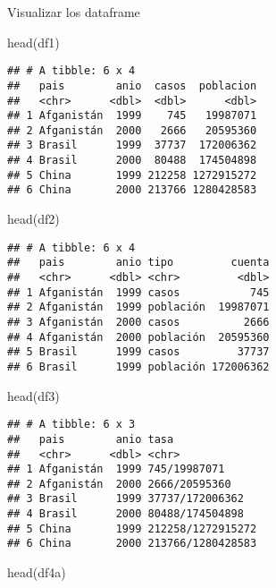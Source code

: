 \documentclass[
]{article}
\newenvironment{Shaded}{\begin{snugshade}}{\end{snugshade}}
\newcommand{\FunctionTok}[1]{\textcolor[rgb]{0.00,0.00,0.00}{#1}}
\newcommand{\NormalTok}[1]{#1}
\begin{document}
Visualizar los dataframe

\begin{Shaded}
\begin{Highlighting}[]
\FunctionTok{head}\NormalTok{(df1)}
\end{Highlighting}
\end{Shaded}

\begin{verbatim}
## # A tibble: 6 x 4
##   pais        anio  casos  poblacion
##   <chr>      <dbl>  <dbl>      <dbl>
## 1 Afganistán  1999    745   19987071
## 2 Afganistán  2000   2666   20595360
## 3 Brasil      1999  37737  172006362
## 4 Brasil      2000  80488  174504898
## 5 China       1999 212258 1272915272
## 6 China       2000 213766 1280428583
\end{verbatim}

\begin{Shaded}
\begin{Highlighting}[]
\FunctionTok{head}\NormalTok{(df2)}
\end{Highlighting}
\end{Shaded}

\begin{verbatim}
## # A tibble: 6 x 4
##   pais        anio tipo         cuenta
##   <chr>      <dbl> <chr>         <dbl>
## 1 Afganistán  1999 casos           745
## 2 Afganistán  1999 población  19987071
## 3 Afganistán  2000 casos          2666
## 4 Afganistán  2000 población  20595360
## 5 Brasil      1999 casos         37737
## 6 Brasil      1999 población 172006362
\end{verbatim}

\begin{Shaded}
\begin{Highlighting}[]
\FunctionTok{head}\NormalTok{(df3)}
\end{Highlighting}
\end{Shaded}

\begin{verbatim}
## # A tibble: 6 x 3
##   pais        anio tasa             
##   <chr>      <dbl> <chr>            
## 1 Afganistán  1999 745/19987071     
## 2 Afganistán  2000 2666/20595360    
## 3 Brasil      1999 37737/172006362  
## 4 Brasil      2000 80488/174504898  
## 5 China       1999 212258/1272915272
## 6 China       2000 213766/1280428583
\end{verbatim}

\begin{Shaded}
\begin{Highlighting}[]
\FunctionTok{head}\NormalTok{(df4a)}
\end{Highlighting}
\end{Shaded}
\end{document}
